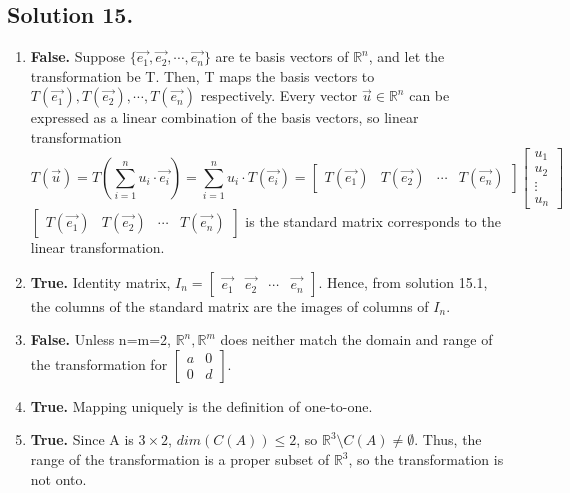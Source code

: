 \documentclass{article}
\begin{document}
\subsection*{Solution 15.}
\begin{enumerate}
    \item \textbf{False.} Suppose $\{\Vec{e_1},\Vec{e_2},\cdots,\Vec{e_n}\}$ are te basis vectors of $\mathbb{R}^n$, and let the transformation be T. Then, T maps the basis vectors to $T(\Vec{e_1}),T(\Vec{e_2}),\cdots,T(\Vec{e_n})$ respectively.\newline
    Every vector $\vec{u}\in\mathbb{R}^n$ can be expressed as a linear combination of the basis vectors, so linear transformation 
    \[T(\vec{u})=T(\sum_{i=1}^n u_i\cdot\vec{e_i})=\sum_{i=1}^n u_i\cdot T(\vec{e_i})=\left[\begin{array}{cccc}T(\vec{e_1})&T(\vec{e_2})&\cdots&T(\vec{e_n})\end{array}\right]\left[\begin{array}{c}u_1\\u_2\\\vdots\\u_n\end{array}\right]\]
    $\left[\begin{array}{cccc}T(\vec{e_1})&T(\vec{e_2})&\cdots&T(\vec{e_n})\end{array}\right]$ is the standard matrix corresponds to the linear transformation.
    \item \textbf{True.} Identity matrix, $I_n=\left[\begin{array}{cccc}\vec{e_1}&\vec{e_2}&\cdots&\vec{e_n}\end{array}\right]$. Hence, from solution 15.1, the columns of the standard matrix are the images of columns of $I_n$.
    \item \textbf{False.}\newline
    Unless n=m=2, $\mathbb{R}^n,\mathbb{R}^m$ does neither match the domain and range of the transformation for $\left[\begin{array}{cc}a&0\\0&d\end{array}\right]$.
    \item \textbf{True.} Mapping uniquely is the definition of one-to-one.
    \item \textbf{True.} Since A is $3 \times 2$, $dim(C(A))\leq 2$, so $\mathbb{R}^3\setminus C(A)\neq \emptyset$. Thus, the range of the transformation is a proper subset of $\mathbb{R}^3$, so the transformation is not onto.
\end{enumerate}
\end{document}
